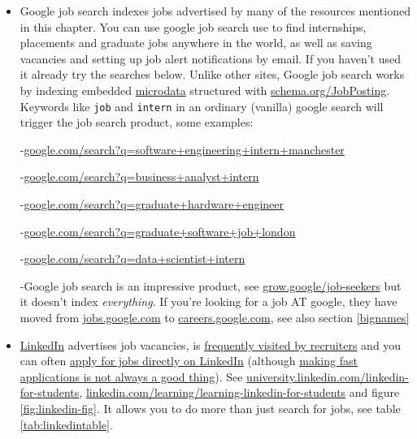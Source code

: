 \documentclass[
]{book}
\begin{document}
\begin{itemize}
\item
  Google job search indexes jobs advertised by many of the resources mentioned in this chapter. You can use google job search use to find internships, placements and graduate jobs anywhere in the world, as well as saving vacancies and setting up job alert notifications by email. If you haven't used it already try the searches below. Unlike other sites, Google job search works by indexing embedded \href{https://en.wikipedia.org/wiki/Microdata_(HTML)}{microdata} structured with \href{https://schema.org/JobPosting}{schema.org/JobPosting}. Keywords like \texttt{job} and \texttt{intern} in an ordinary (vanilla) google search will trigger the job search product, some examples:

  -\href{https://www.google.com/search?q=software+engineering+intern+manchester}{google.com/search?q=software+engineering+intern+manchester}

  -\href{https://www.google.com/search?q=business+analyst+intern}{google.com/search?q=business+analyst+intern}

  -\href{https://www.google.com/search?q=graduate+hardware+engineer}{google.com/search?q=graduate+hardware+engineer}

  -\href{https://www.google.com/search?q=graduate+software+job+london}{google.com/search?q=graduate+software+job+london}

  -\href{https://www.google.com/search?q=data+scientist+intern}{google.com/search?q=data+scientist+intern}

  -Google job search is an impressive product, see \href{https://grow.google/job-seekers}{grow.google/job-seekers} but it doesn't index \emph{everything}. If you're looking for a job AT google, they have moved from \href{https://jobs.google.com/about/}{jobs.google.com} to \href{https://careers.google.com/}{careers.google.com}, see also section \ref{bignames}
\item
  \href{http://www.linkedin.com}{LinkedIn} advertises job vacancies, is \href{https://blog.linkedin.com/2016/10/06/now-you-can-privately-signal-to-recruiters-youre-open-to-new-job}{frequently visited by recruiters} and you can often \href{https://www.linkedin.com/help/linkedin/answer/75815/applying-for-jobs-on-linkedin?lang=en}{apply for jobs directly on LinkedIn} (although \href{https://medium.com/otta-blog/job-boards-making-fast-applications-is-not-a-good-thing-5a4970887ecd}{making fast applications is not always a good thing}). See \href{https://university.linkedin.com/linkedin-for-students}{university.linkedin.com/linkedin-for-students}, \href{https://www.linkedin.com/learning/learning-linkedin-for-students}{linkedin.com/learning/learning-linkedin-for-students} and figure \ref{fig:linkedin-fig}. It allows you to do more than just search for jobs, see table \ref{tab:linkedintable}.
\end{itemize}
\end{document}
